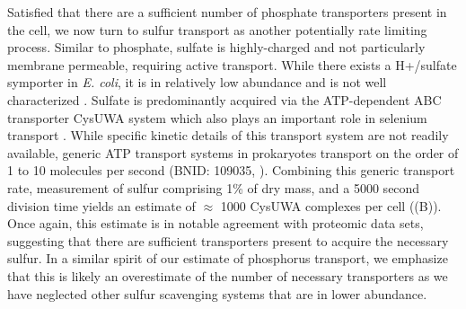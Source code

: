 Satisfied that there are a sufficient number of phosphate transporters
present in the cell, we now turn to sulfur transport as another potentially rate
limiting process. Similar to phosphate, sulfate is  highly-charged
and not particularly membrane permeable, requiring active
transport. While there exists a H+/sulfate symporter in \textit{E.
coli}, it is in relatively low abundance and is not well characterized
\citep{zhang2014}. Sulfate is predominantly acquired via the ATP-dependent ABC
transporter CysUWA system which also plays an important role in selenium
transport \citep{sekowska2000, sirko1995}. While specific kinetic details of
this transport system are not readily available, generic ATP transport
systems in prokaryotes transport on the order of 1 to 10 molecules per second
(BNID: 109035, \cite{milo2010}). Combining this generic
transport rate, measurement of sulfur comprising 1\% of dry mass, and a 5000
second division time yields an estimate of $\approx$ 1000 CysUWA
complexes per cell ((B)). Once again, this estimate
is in notable agreement with proteomic data sets, suggesting that there are
sufficient transporters present to acquire the necessary sulfur. In a similar
spirit of our estimate of phosphorus transport, we emphasize that this is
likely an overestimate of the number of necessary transporters as we have
neglected other sulfur scavenging systems that are in lower abundance.


